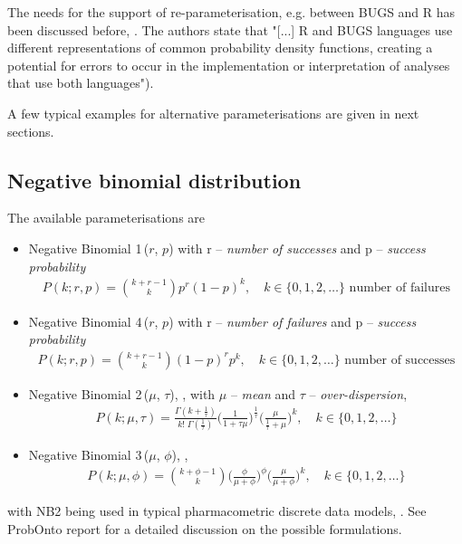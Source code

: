 {The needs for the support of re-parameterisation, e.g. between BUGS and R has been 
discussed before, \cite{lebauer2013translating}. The authors state that "[...] R and BUGS 
languages use different representations of common probability density 
functions, creating a potential for errors to occur in the implementation 
or interpretation of analyses that use both languages"). 

A few typical examples for alternative parameterisations are given in next sections.

\subsection{Negative binomial distribution} 
\label{subsec:altNB}
The available parameterisations are
\begin{itemize}
\item
Negative Binomial 1\,($r$, $p$) with r -- \emph{number of successes} and p -- \emph{success probability}
\begin{align}
P(k;r,p) = \binom {k+r-1}k p^r (1-p)^k, \quad k\in \{0,1,2,\dots \} \text{ number of failures} \nonumber
\end{align}

\item
Negative Binomial 4\,($r$, $p$) with r -- \emph{number of failures} and p -- \emph{success probability}
\begin{align}
P(k;r,p) = \binom {k+r-1}k (1-p)^r p^k, \quad k\in \{0,1,2,\dots \} \text{ number of successes} \nonumber
\end{align}

\item
Negative Binomial 2\,($\mu$, $\tau$), \cite{Plan:2009fk}, with $\mu$ -- \emph{mean} and $\tau$ -- \emph{over-dispersion},
\begin{align}
P(k;\mu,\tau) = \frac{\Gamma(k+\frac{1}{\tau})}{k!\; \Gamma(\frac{1}{\tau})} \Big(\frac{1}{1+\tau \mu} \Big)^{\frac{1}{\tau}} \Big(\frac{\mu}{\frac{1}{\tau} + \mu} \Big)^{k},\quad k\in \{0,1,2,\dots \}  \nonumber
\end{align}

\item
Negative Binomial 3\,($\mu$, $\phi$), \cite{stan-manual:2015}, %
\begin{align}
P(k;\mu,\phi) = \binom {k+\phi-1}k \Big(\frac{\phi}{\mu + \phi} \Big)^{\phi} \Big(\frac{\mu}{\mu + \phi} \Big)^{k},\quad k\in \{0,1,2,\dots \}  \nonumber
\end{align}
\end{itemize}
with NB2 being used in typical pharmacometric discrete data models, \cite{Plan:2009fk, Troconiz:2009fv}.
See ProbOnto report \cite{ProbOnto:2015a} for a detailed discussion on the possible formulations. 

}
